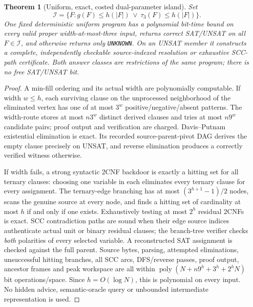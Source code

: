 \documentclass[11pt]{article}
\newtheorem{theorem}{Theorem}
\begin{document}
\begin{theorem}[Uniform, exact, costed dual-parameter island]
Set
\[\mathcal I=\{F:g(F)\le h(|F|)\ \lor\ \tau_3(F)\le h(|F|)\}.\]
One fixed deterministic uniform program has a polynomial bit-time bound on \emph{every} valid proper width-at-most-three input, returns correct SAT/UNSAT on all $F\in\mathcal I$, and otherwise returns only \texttt{UNKNOWN}. On an UNSAT member it constructs a complete, independently checkable source-indexed resolution or exhaustive SCC-path certificate. Both answer classes are restrictions of \emph{the same program}; there is no free SAT/UNSAT bit.
\end{theorem}
\begin{proof}
A min-fill ordering and its actual width are polynomially computable. If width $w\le h$, each surviving clause on the unprocessed neighborhood of the eliminated vertex has one of at most $3^w$ positive/negative/absent patterns. The width-route stores at most $n3^w$ distinct derived clauses and tries at most $n9^w$ candidate pairs; proof output and verification are charged. Davis--Putnam existential elimination is exact. Its recorded source-parent-pivot DAG derives the empty clause precisely on UNSAT, and reverse elimination produces a correctly verified witness otherwise.

If width fails, a strong syntactic 2CNF backdoor is exactly a hitting set for all ternary clauses: choosing one variable in each eliminates every ternary clause for every assignment. The ternary-edge branching has at most $(3^{h+1}-1)/2$ nodes, scans the genuine source at every node, and finds a hitting set of cardinality at most $h$ if and only if one exists. Exhaustively testing at most $2^h$ residual 2CNFs is exact. SCC contradiction paths are sound when their edge source indices authenticate actual unit or binary residual clauses; the branch-tree verifier checks \emph{both} polarities of every selected variable. A reconstructed SAT assignment is checked against the full parent. Source bytes, parsing, attempted eliminations, unsuccessful hitting branches, all SCC arcs, DFS/reverse passes, proof output, ancestor frames and peak workspace are all within $\operatorname{poly}(N+n9^h+3^h+2^hN)$ bit operations/space. Since $h=O(\log N)$, this is polynomial on every input. No hidden advice, semantic-oracle query or unbounded intermediate representation is used.
\end{proof}
\end{document}
